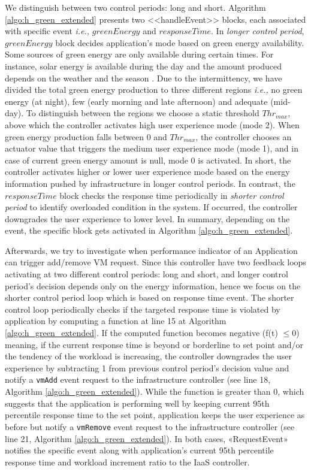 We distinguish between two control periods: long and short. Algorithm \ref{algo:h_green_extended} presents two <<handleEvent>> blocks, each associated with specific event \emph{i.e.,} $greenEnergy$ and $responseTime$.
In \emph{longer control period}, $greenEnergy$ block decides application's mode based on green energy availability. Some sources of green energy are only available during certain times. For instance, solar energy is available during the day and the amount produced depends on the weather and the season \cite{GreenHadoop}. Due to the intermittency, we have divided the total green energy production to three different regions \emph{i.e.,} no green energy (at night), few (early morning and late afternoon) and adequate (mid-day). To distinguish between the regions we choose a static threshold $Thr_{max}$, above which the controller activates high user experience mode (mode 2). When green energy production falls between $0$ and $Thr_{max}$, the controller chooses an actuator value that triggers the medium user experience mode (mode 1), and in case of current green energy amount is null, mode 0 is activated. In short, the controller activates higher or lower user experience mode based on the energy information pushed by infrastructure in longer control periods. In contrast, the
$responseTime$ block checks the response time periodically in \emph{shorter control period} to identify overloaded condition in the system. If occurred,
the controller downgrades the user experience to lower level. In summary, depending on the event, the specific block gets activated in Algorithm \ref{algo:h_green_extended}.

Afterwards, we try to investigate when performance indicator of an Application can trigger add/remove VM request. Since this controller have two feedback loops activating at two different control periods: long and short, and longer control period's decision depends only on the energy information, hence we focus on the shorter control period loop which is based on response time event. The shorter control loop periodically checks if the targeted response time is violated by application by computing a function at line 15 at Algorithm \ref{algo:h_green_extended}. If the computed function becomes negative (f(t) $\leq 0$) meaning, if the current response time is beyond or borderline to set point and/or the tendency of the workload is increasing, the controller downgrades the user experience by subtracting 1 from previous control period's decision value and notify a \texttt{vmAdd} event request to the infrastructure controller (see line 18, Algorithm \ref{algo:h_green_extended}). While the function is greater than $0$, which suggests that the application is performing well by keeping current 95th percentile response time to the set point, application keeps the user experience as before but notify a \texttt{vmRemove} event request to the infrastructure controller (see line 21, Algorithm \ref{algo:h_green_extended}). In both cases, «RequestEvent» notifies the specific event along with application's current 95th percentile response time and workload increment ratio to the IaaS controller.

